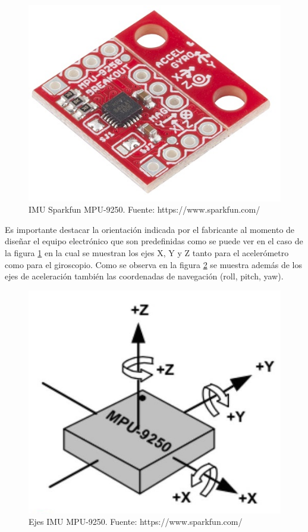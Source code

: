 \begin{figure}[H]
	\centering
	\includegraphics[scale=1.5]{figuras/sensor/imu/imu1.jpg}
	\caption{IMU Sparkfun MPU-9250. Fuente: https://www.sparkfun.com/}
	\label{imu1}
\end{figure}

Es importante destacar la orientación indicada por el fabricante al momento de diseñar el equipo electrónico que son predefinidas como se puede ver en el caso de la figura \ref{imu1} en la cual se muestran los ejes X, Y y Z tanto para el acelerómetro como para el giroscopio. 
\newpage
Como se observa en la figura \ref{imu11} se muestra además de los ejes de aceleración también las coordenadas de navegación (roll, pitch, yaw). 

\begin{figure}[H]
	\centering
	\includegraphics[scale=0.5]{figuras/sensor/imu/imu11.jpg}
	\caption{Ejes IMU MPU-9250. Fuente: https://www.sparkfun.com/}
	\label{imu11}
\end{figure}

